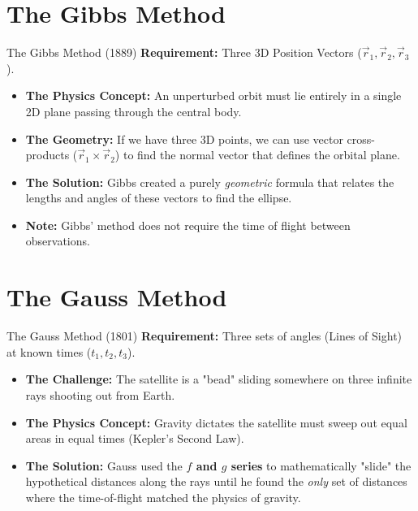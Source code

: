 \documentclass[aspectratio=169]{beamer}
\begin{document}
\section{The Gibbs Method}

\begin{frame}{The Gibbs Method (1889)}
    \textbf{Requirement:} Three 3D Position Vectors ($\vec{r}_1, \vec{r}_2, \vec{r}_3$).
    
    \vspace{0.3cm}
    \begin{itemize}
        \item \textbf{The Physics Concept:} An unperturbed orbit must lie entirely in a single 2D plane passing through the central body.
        \item \textbf{The Geometry:} If we have three 3D points, we can use vector cross-products ($\vec{r}_1 \times \vec{r}_2$) to find the normal vector that defines the orbital plane.
        \item \textbf{The Solution:} Gibbs created a purely \textit{geometric} formula that relates the lengths and angles of these vectors to find the ellipse. 
        \item \textbf{Note:} Gibbs' method does not require the time of flight between observations.
    \end{itemize}
\end{frame}

\section{The Gauss Method}

\begin{frame}{The Gauss Method (1801)}
    \textbf{Requirement:} Three sets of angles (Lines of Sight) at known times ($t_1, t_2, t_3$).
    
    \vspace{0.3cm}
    \begin{itemize}
        \item \textbf{The Challenge:} The satellite is a "bead" sliding somewhere on three infinite rays shooting out from Earth.
        \item \textbf{The Physics Concept:} Gravity dictates the satellite must sweep out equal areas in equal times (Kepler's Second Law).
        \item \textbf{The Solution:} Gauss used the \textbf{$f$ and $g$ series} to mathematically "slide" the hypothetical distances along the rays until he found the \textit{only} set of distances where the time-of-flight matched the physics of gravity.
    \end{itemize}
\end{frame}
\end{document}
